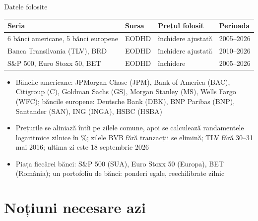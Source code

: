 \begin{frame}{Datele folosite}
\itemsize{\footnotesize}
\begin{center}
\footnotesize
\begin{tabular}{llll}
\toprule
\textbf{Seria} & \textbf{Sursa} & \textbf{Prețul folosit} & \textbf{Perioada} \\
\midrule
6 bănci americane, 5 bănci europene & EODHD & închidere ajustată & 2005--2026 \\
Banca Transilvania (TLV), BRD & EODHD & închidere ajustată & 2010--2026 \\
S\&P 500, Euro Stoxx 50, BET & EODHD & închidere & 2005--2026 \\
\bottomrule
\end{tabular}
\end{center}
\begin{itemize}
    \item Băncile americane: JPMorgan Chase (JPM), Bank of America (BAC), Citigroup (C), Goldman Sachs (GS), Morgan Stanley (MS), Wells Fargo (WFC); băncile europene: Deutsche Bank (DBK), BNP Paribas (BNP), Santander (SAN), ING (INGA), HSBC (HSBA)
    \item Prețurile se aliniază întîi pe zilele comune, apoi se calculează randamentele logaritmice zilnice în \%; zilele BVB fără tranzacții se elimină; TLV fără 30--31 mai 2016; ultima zi este 18 septembrie 2026
    \item Piața fiecărei bănci: S\&P 500 (SUA), Euro Stoxx 50 (Europa), BET (România); un portofoliu de bănci: ponderi egale, reechilibrate zilnic
\end{itemize}
\end{frame}


\section{Noțiuni necesare azi}

